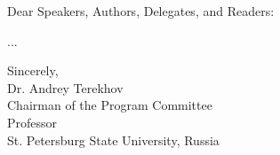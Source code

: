 \cleardoublepage
{}

Dear Speakers, Authors, Delegates, and Readers:

...

\vspace{18pt}
Sincerely,\\
Dr. Andrey Terekhov\\
Chairman of the Program Committee \\
Professor\\
St. Petersburg State University, Russia
